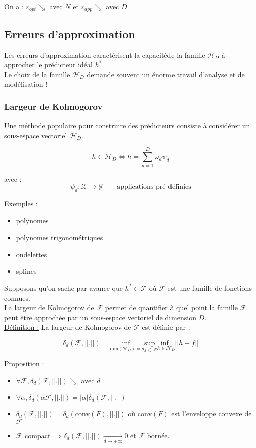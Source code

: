 \documentclass[12pt,a4paper]{article}
\begin{document}
On a :
$\varepsilon_{opt} \searrow$ avec $N$ et $\varepsilon_{app} \searrow$ avec $D$\\


\subsection*{Erreurs d'approximation}
Les erreurs d'approximation caractérisent la capacitéde la famille $\mathcal{H}_D$ à approcher le prédicteur idéal $h^*$.\\

Le choix de la famille $\mathcal{H}_D$ demande souvent un énorme travail d'analyse et de modélisation !

\subsubsection*{Largeur de Kolmogorov}
Une méthode populaire pour construire des prédicteurs consiste à considérer un sous-espace vectoriel $\mathcal{H}_D$.

$$
h \in \mathcal{H}_D \Leftrightarrow h = \sum_{d=1}^D \omega_d \psi_d
$$

avec :
$$
\psi_d : \mathcal{X} \rightarrow \mathcal{Y} \qquad \text{applications pré-définies}
$$


Exemples :
\begin{itemize}
    \item polynomes
    \item polynomes trigonométriques
    \item ondelettes
    \item splines
\end{itemize}

Supposons qu'on sache par avance que $h^* \in \mathcal{F}$ où $\mathcal{F}$ est une famille de fonctions connues.\\

La largeur de Kolmogorov de $\mathcal{F}$ permet de quantifier à quel point la famille $\mathcal{F}$ peut être approchée par un sous-espace vectoriel de dimension $D$.\\

\underline{Définition :} La largeur de Kolmogorov de $\mathcal{F}$ est définie par :

$$
\delta_d(\mathcal{F}, ||.||) = \underset{\text{dim}(\mathcal{H}_D) = d}{\text{inf }} \underset{f \in \mathcal{F}}{\text{sup }} \underset{h \in \mathcal{H}_D}{\text{inf }} ||h - f||
$$


\underline{Proposition :}
\begin{itemize}
    \item $\forall \mathcal{F}, \delta_d(\mathcal{F}, ||.||) \searrow$ avec $d$
    \item $\forall \alpha, \delta_d(\alpha \mathcal{F}, ||.||) = |\alpha| \delta_d(\mathcal{F}, ||.||)$
    \item $\delta_d(\mathcal{F}, ||.||) = \delta_d(\text{conv}(F), ||.||)$ où $\text{conv}(F)$ est l'enveloppe convexe de $\mathcal{F}$
    \item $\mathcal{F}$ compact $\Rightarrow \delta_d(\mathcal{F}, ||.||) \underset{d \rightarrow + \infty}{\rightarrow}0$ et $\mathcal{F}$ bornée.
\end{itemize}
\end{document}
